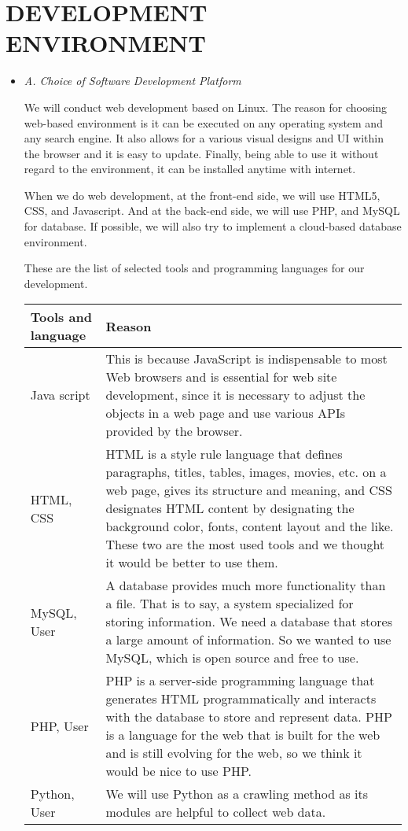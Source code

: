 \documentclass[twocolumn, letterpaper]{scrartcl}
\begin{document}
\section{DEVELOPMENT ENVIRONMENT}
\begin{itemize}
\item 
\textit{A. Choice of Software Development Platform}

We will conduct web development based on Linux. The reason for choosing web-based environment is it can be executed on any operating system and any search engine. It also allows for a various visual designs and UI within the browser and it is easy to update. Finally, being able to use it without regard to the environment, it can be installed anytime with internet.

When we do web development, at the front-end side, we will use HTML5, CSS, and Javascript. And at the back-end side, we will use PHP, and MySQL for database. If possible, we will also try to implement a cloud-based database environment.

These are the list of selected tools and programming languages for our development.

\begin{adjustbox}{width=7cm}
   \begin{center}
    \begin{tabular}{|p{3cm}|p{5cm}|}
    \hline
      Tools and language & Reason\\
    \hline
     Java script & This is because JavaScript is indispensable to most Web browsers and is essential for web site development, since it is necessary to adjust the objects in a web page and use various APIs provided by the browser. \\
    \hline
      HTML, CSS & HTML is a style rule language that defines paragraphs, titles, tables, images, movies, etc. on a web page, gives its structure and meaning, and CSS designates HTML content by designating the background color, fonts, content layout and the like. These two are the most used tools and we thought it would be better to use them.\\
    \hline
      MySQL, User & A database provides much more functionality than a file. That is to say, a system specialized for storing information. We need a database that stores a large amount of information. So we wanted to use MySQL, which is open source and free to use.\\
    \hline
      PHP, User & PHP is a server-side programming language that generates HTML programmatically and interacts with the database to store and represent data. PHP is a language for the web that is built for the web and is still evolving for the web, so we think it would be nice to use PHP.\\
    \hline
      Python, User & We will use Python as a crawling method as its modules are helpful to collect web data.\\
    \hline
    \end{tabular}
    \end{center}
\end{adjustbox}


\end{itemize}
\end{document}
